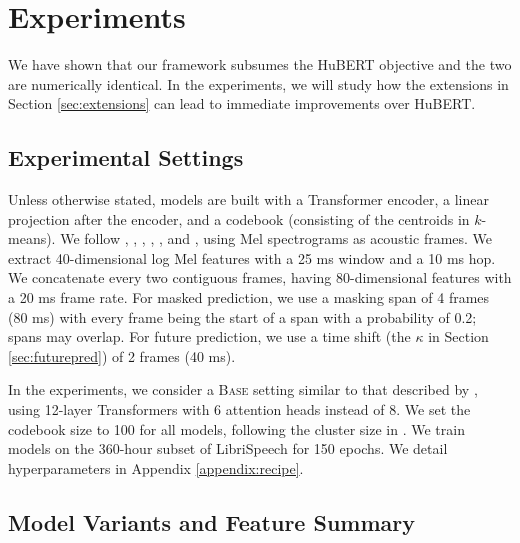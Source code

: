 \documentclass[11pt,a4paper]{article}
\begin{document}
\section{Experiments}
\label{sec:exp}

We have shown that our framework subsumes the HuBERT objective and the two are numerically identical.
In the experiments, we will study how the extensions in Section \ref{sec:extensions} can lead to immediate improvements over HuBERT.


\subsection{Experimental Settings}
\label{exp:setup}

Unless otherwise stated, models are built with a Transformer encoder, a linear projection after the encoder, and a codebook (consisting of the centroids in $k$-means).
We follow \citet{chung2019unsupervised}, \citet{jiang2019improving}, \citet{ling2020decoar}, \citet{misra21_interspeech}, \citet{chiu2022self}, and \citet{lin2022melhubert}, using Mel spectrograms as acoustic frames.
We extract 40-dimensional log Mel features with a 25 ms window and a 10 ms hop.
We concatenate every two contiguous frames, having 80-dimensional features with a 20 ms frame rate.
For masked prediction, we use a masking span of 4 frames (80 ms) with every frame being the start of a span with a probability of 0.2; spans may overlap.
For future prediction, we use a time shift (the $\kappa$ in Section \ref{sec:futurepred}) of 2 frames (40 ms).

%
%
%
In the experiments, we consider a \textsc{Base} setting similar to that
described by \citet{baevski2020wav2vec,hsu2021hubert}, using 12-layer Transformers
with 6 attention heads instead of 8.
%
We set the codebook size to 100 for all models, following the cluster size
in \citet{hsu2021hubert}.
We train models on the 360-hour subset of LibriSpeech \citep{panayotov2015librispeech}
for 150 epochs.
We detail hyperparameters in Appendix \ref{appendix:recipe}.

%
%
%
%
%
%
%

\subsection{Model Variants and Feature Summary}
\end{document}
